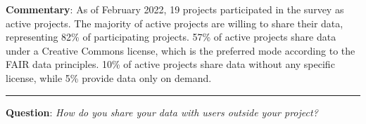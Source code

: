 \documentclass[
  12pt,
]{scrreprt}
\begin{document}
\normalsize

\textbf{Commentary}: As of February 2022, 19 projects participated in
the survey as active projects. The majority of active projects are
willing to share their data, representing 82\% of participating
projects. 57\% of active projects share data under a Creative Commons
license, which is the preferred mode according to the FAIR data
principles. 10\% of active projects share data without any specific
license, while 5\% provide data only on demand.

\begin{center}\rule{0.5\linewidth}{0.5pt}\end{center}

\textbf{Question}: \emph{How do you share your data with users outside
your project?}

\footnotesize
\end{document}

